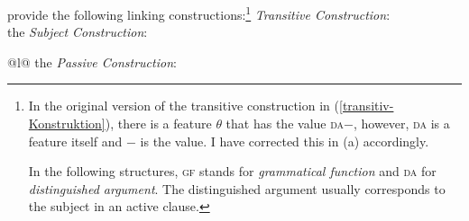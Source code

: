 \citet[--57]{MR2001a} provide the following linking constructions:\footnote{%
	In the original version of the transitive construction in (\ref{transitiv-Konstruktion}),
        there is a feature $\theta$ that has the value \textsc{da}$-$, however, \textsc{da} is a
        feature itself and $-$ is the value. I have corrected this in (a) accordingly.
	
	In the following structures, \textsc{gf} stands for \emph{grammatical function} and \textsc{da} for \emph{distinguished argument}. The distinguished argument usually corresponds to the subject in an active clause.%
}
\eal
\label{linking-konstruktionen}
\ex\label{transitiv-Konstruktion} \emph{Transitive Construction}:\\
\ex the \emph{Subject Construction}:\\
\ex 
\begin{tabular}[t]{@{}l@{}}
the \emph{Passive Construction}:\\
\end{tabular}
\zl

